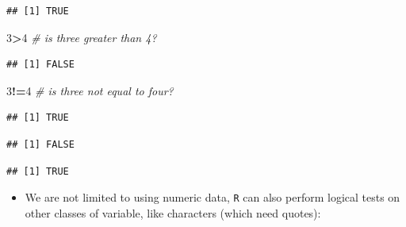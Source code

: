 \documentclass[]{book}
\newenvironment{Shaded}{\begin{snugshade}}{\end{snugshade}}
\newcommand{\KeywordTok}[1]{\textcolor[rgb]{0.13,0.29,0.53}{\textbf{#1}}}
\newcommand{\DecValTok}[1]{\textcolor[rgb]{0.00,0.00,0.81}{#1}}
\newcommand{\StringTok}[1]{\textcolor[rgb]{0.31,0.60,0.02}{#1}}
\newcommand{\CommentTok}[1]{\textcolor[rgb]{0.56,0.35,0.01}{\textit{#1}}}
\newcommand{\OperatorTok}[1]{\textcolor[rgb]{0.81,0.36,0.00}{\textbf{#1}}}
\newcommand{\NormalTok}[1]{#1}
\providecommand{\tightlist}{%
  \setlength{\itemsep}{0pt}\setlength{\parskip}{0pt}}
\theoremstyle{definition}
\theoremstyle{definition}
\theoremstyle{definition}
\theoremstyle{remark}
\begin{document}
\begin{verbatim}
## [1] TRUE
\end{verbatim}

\begin{Shaded}
\begin{Highlighting}[]
\DecValTok{3}\OperatorTok{>}\DecValTok{4} \CommentTok{# is three greater than 4?}
\end{Highlighting}
\end{Shaded}

\begin{verbatim}
## [1] FALSE
\end{verbatim}

\begin{Shaded}
\begin{Highlighting}[]
\DecValTok{3}\OperatorTok{!=}\DecValTok{4} \CommentTok{# is three not equal to four?}
\end{Highlighting}
\end{Shaded}

\begin{verbatim}
## [1] TRUE
\end{verbatim}

\begin{Shaded}
\end{Shaded}

\begin{verbatim}
## [1] FALSE
\end{verbatim}

\begin{Shaded}
\end{Shaded}

\begin{verbatim}
## [1] TRUE
\end{verbatim}

\begin{itemize}
\tightlist
\item
  We are not limited to using numeric data, \texttt{R} can also perform
  logical tests on other classes of variable, like characters (which
  need quotes):
\end{itemize}
\end{document}

